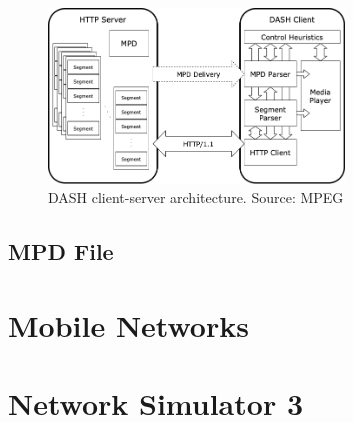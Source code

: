 \begin{figure}[h]
  \centering
  \includegraphics[width=0.7\textwidth]{img/dasharch.png}
  \caption{DASH client-server architecture. Source: MPEG \cite{ios1}}
  \label{fig:dasharch}
\end{figure}

\subsection{MPD File}
\label{sec:mpd}

\section{Mobile Networks}
\label{sec:mobile}




\section{Network Simulator 3}
\label{sec:ns3}

